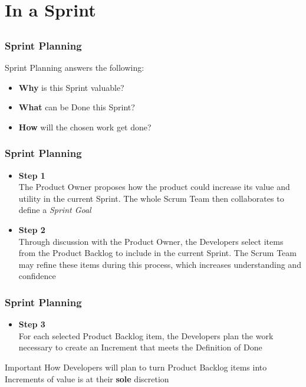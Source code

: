 \section{In a Sprint}
\subsection{}

\begin{frame}
	\frametitle{Sprint Planning}
	Sprint Planning answers the following:
	\vspace{1em}
	\begin{itemize}
		\setlength\itemsep{0.7em}
		\item \textbf{Why} is this Sprint valuable?
		\item \textbf{What} can be Done this Sprint?
		\item \textbf{How} will the chosen work get done?
	\end{itemize}
\end{frame}

\begin{frame}
    \frametitle{Sprint Planning}
    \begin{itemize}
        \setlength\itemsep{0.7em}
        \item<1-> \textbf{Step 1}\\
        The Product Owner proposes how the product could increase its value and utility in the current Sprint. The whole Scrum Team then collaborates to define a \textit{Sprint Goal}
        \item<2-> \textbf{Step 2}\\
        Through discussion with the Product Owner, the Developers select items from the Product Backlog to include in the current Sprint. The Scrum Team may refine these items during this process, which increases understanding and confidence
    \end{itemize}
\end{frame}

\begin{frame}
    \frametitle{Sprint Planning}
    \begin{itemize}
        \setlength\itemsep{0.7em}
        \item \textbf{Step 3}\\
        For each selected Product Backlog item, the Developers plan the work necessary to create an Increment that meets the Definition of Done
    \end{itemize}
     {
        \vspace{1em}
        \begin{alertblock}{Important}
            How Developers will plan to turn Product Backlog items into Increments of value is at their \textbf{sole} discretion
        \end{alertblock}
    }
\end{frame}

